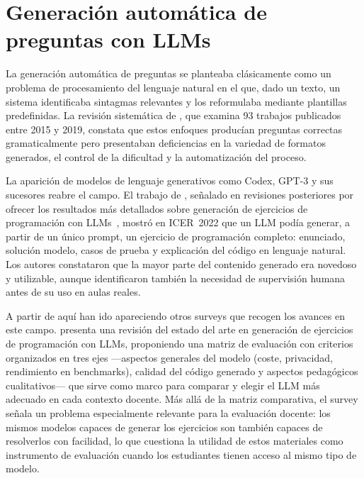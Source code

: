 \section{Generación automática de preguntas con LLMs}
\label{sec:aqg-llms}

La generación automática de preguntas se planteaba clásicamente como un
problema de procesamiento del lenguaje natural en el que, dado un texto,
un sistema identificaba sintagmas relevantes y los reformulaba mediante
plantillas predefinidas. La revisión sistemática de
\textcite{kurdi2020aqgreview}, que examina 93 trabajos publicados entre
2015 y 2019, constata que estos enfoques producían preguntas correctas
gramaticalmente pero presentaban deficiencias en la
variedad de formatos generados, el control de la dificultad y la
automatización del proceso.

La aparición de modelos de lenguaje generativos como Codex, GPT-3 y sus
sucesores reabre el campo. El trabajo de \textcite{sarsa2022autogen},
señalado en revisiones posteriores por ofrecer los resultados más
detallados sobre generación de ejercicios de programación con
LLMs~\parencite{frankford2024survey}, mostró en ICER~2022 que un LLM
podía generar, a partir de un único prompt, un ejercicio de programación completo: enunciado, solución modelo, casos de prueba y explicación del código en lenguaje natural. Los autores constataron que la mayor parte del contenido generado era novedoso y utilizable, aunque identificaron también la necesidad de supervisión humana antes de su uso en aulas reales.

A partir de aquí han ido apareciendo otros surveys que recogen los
avances en este campo. \textcite{frankford2024survey} presenta una revisión del
estado del arte en generación de ejercicios de programación con LLMs,
proponiendo una matriz de evaluación con criterios organizados en tres
ejes —aspectos generales del modelo (coste, privacidad, rendimiento en
benchmarks), calidad del código generado y aspectos pedagógicos
cualitativos— que sirve como marco para comparar y elegir el LLM más
adecuado en cada contexto docente. Más allá de la matriz comparativa, el survey señala un
problema especialmente relevante para la evaluación docente: los mismos
modelos capaces de generar los ejercicios son también capaces de
resolverlos con facilidad, lo que cuestiona la utilidad de estos
materiales como instrumento de evaluación cuando los estudiantes tienen
acceso al mismo tipo de modelo.

